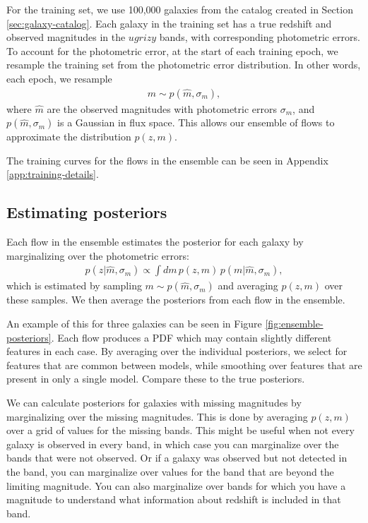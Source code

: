 \documentclass[twocolumn]{aastex631}
\begin{document}
For the training set, we use 100,000 galaxies from the catalog created in Section \ref{sec:galaxy-catalog}.
Each galaxy in the training set has a true redshift and observed magnitudes in the $ugrizy$ bands, with corresponding photometric errors.
To account for the photometric error, at the start of each training epoch, we resample the training set from the photometric error distribution.
In other words, each epoch, we resample
\begin{align}
    m \sim p(\hat{m}, \sigma_m),
\end{align}
where $\hat{m}$ are the observed magnitudes with photometric errors $\sigma_m$, and $p(\hat{m}, \sigma_m)$ is a Gaussian in flux space.
This allows our ensemble of flows to approximate the distribution $p(z, m)$.

The training curves for the flows in the ensemble can be seen in Appendix \ref{app:training-details}.


\subsection{Estimating posteriors}

Each flow in the ensemble estimates the posterior for each galaxy by marginalizing over the photometric errors:
\begin{align}
    p(z| \hat{m}, \sigma_m) \propto \int dm \, p(z, m) \, p(m| \hat{m}, \sigma_m),
\end{align}
which is estimated by sampling $m \sim p(\hat{m}, \sigma_m)$ and averaging $p(z, m)$ over these samples.
We then average the posteriors from each flow in the ensemble.

An example of this for three galaxies can be seen in Figure \ref{fig:ensemble-posteriors}.
Each flow produces a PDF which may contain slightly different features in each case.
By averaging over the individual posteriors, we select for features that are common between models, while smoothing over features that are present in only a single model.
Compare these to the true posteriors.

We can calculate posteriors for galaxies with missing magnitudes by marginalizing over the missing magnitudes.
This is done by averaging $p(z, m)$ over a grid of values for the missing bands. 
This might be useful when not every galaxy is observed in every band, in which case you can marginalize over the bands that were not observed.
Or if a galaxy was observed but not detected in the band, you can marginalize over values for the band that are beyond the limiting magnitude.
You can also marginalize over bands for which you have a magnitude to understand what information about redshift is included in that band.
\end{document}
